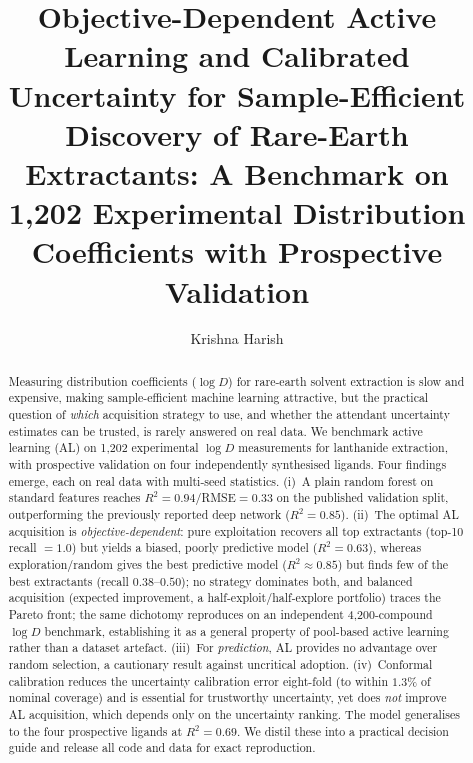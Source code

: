 \documentclass[journal=acsodf,manuscript=article]{achemso}
\author{Krishna Harish}
\affiliation{Lawrence E. Elkins High School, Missouri City, Texas, USA}
\title{Objective-Dependent Active Learning and Calibrated Uncertainty for
Sample-Efficient Discovery of Rare-Earth Extractants: A Benchmark on 1{,}202
Experimental Distribution Coefficients with Prospective Validation}
\begin{document}
\begin{abstract}
Measuring distribution coefficients ($\log D$) for rare-earth solvent extraction is
slow and expensive, making sample-efficient machine learning attractive, but the
practical question of \emph{which} acquisition strategy to use, and whether the
attendant uncertainty estimates can be trusted, is rarely answered on real data. We
benchmark active learning (AL) on 1{,}202 experimental $\log D$ measurements for
lanthanide extraction, with prospective validation on four independently
synthesised ligands. Four findings emerge, each on real data with multi-seed
statistics. (i)~A plain random forest on standard features reaches
$R^2=0.94$/RMSE$=0.33$ on the published validation split, outperforming the
previously reported deep network ($R^2=0.85$). (ii)~The optimal AL acquisition is
\emph{objective-dependent}: pure exploitation recovers all top extractants
(top-10 recall $=1.0$) but yields a biased, poorly predictive model
($R^2=0.63$), whereas exploration/random gives the best predictive model
($R^2\approx0.85$) but finds few of the best extractants (recall $0.38$--$0.50$);
no strategy dominates both, and balanced acquisition (expected improvement, a
half-exploit/half-explore portfolio) traces the Pareto front; the same dichotomy
reproduces on an independent 4{,}200-compound $\log D$ benchmark, establishing it as
a general property of pool-based active learning rather than a dataset artefact. (iii)~For
\emph{prediction}, AL provides no advantage over random selection, a cautionary
result against uncritical adoption. (iv)~Conformal calibration reduces the
uncertainty calibration error eight-fold (to within $1.3\%$ of nominal coverage)
and is essential for trustworthy uncertainty, yet does \emph{not} improve AL
acquisition, which depends only on the uncertainty ranking. The model generalises
to the four prospective ligands at $R^2=0.69$. We distil these into a practical
decision guide and release all code and data for exact reproduction.
\end{abstract}
\end{document}
